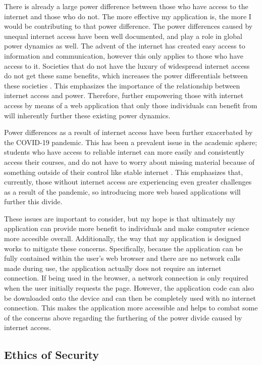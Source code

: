 \documentclass[10pt,twocolumn]{article}
\begin{document}
There is already a large power difference between those who have access to the internet 
and those who do not. The more effective my application is, the more I would be contributing to that power difference. 
The power differences caused by unequal internet access have been well documented, and play a role in global power 
dynamics as well. The advent of the internet has created easy access to information and communication, however this only 
applies to those who have access to it. Societies that do not have the luxury of widespread internet access do not get 
these same benefits, which increases the power differentials between these societies \cite{Fang2018Article}. This 
emphasizes the importance of the relationship between internet access and power. Therefore, further empowering those 
with internet access by means of a web application that only those individuals can benefit from will inherently further 
these existing power dynamics.

Power differences as a result of internet access have been further exacerbated by the COVID-19 pandemic. This has been a 
prevalent issue in the academic sphere; students 
who have access to reliable internet can more easily and consistently access their courses, and do not have to worry 
about missing material because of something outside of their control like stable internet \cite{Lai2020Article}. 
This emphasizes that, currently, those without internet access are experiencing even greater challenges as a result of 
the pandemic, so introducing more web based applications will further this divide. 

These issues are important to 
consider, but my hope is that ultimately my application can provide more benefit to individuals and make computer 
science more accesible overall. Additionally, the way that my application is designed works to mitigate these concerns.
Specifically, because the application can be fully contained within the user's web browser and there are no network calls 
made during use, the application actually does not require an internet connection. If being used in the browser, a 
network connection is only required when the user initially requests the page. However, the application code can also 
be downloaded onto the device and can then be completely used with no internet connection. This makes the application 
more accessible and helps to combat some of the concerns above regarding the furthering of the power divide caused by 
internet access. 

\subsection{Ethics of Security}
\end{document}
